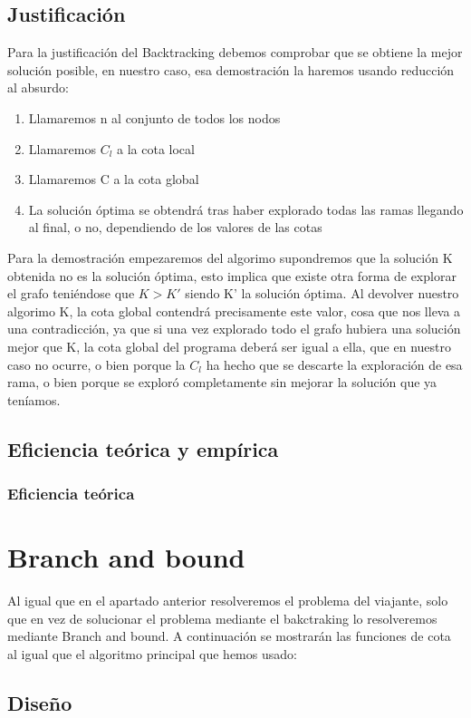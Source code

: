 \documentclass[11pt,openany]{book}
\begin{document}
\section{Justificación}
Para la justificación del Backtracking debemos comprobar que se obtiene la mejor solución posible, en nuestro caso, esa demostración la haremos usando reducción al absurdo:
\begin{enumerate}
    \item Llamaremos n al conjunto de todos los nodos
    \item Llamaremos $C_l$ a la cota local 
    \item Llamaremos C a la cota global
    \item La solución óptima se obtendrá tras haber explorado todas las ramas llegando al final, o no, dependiendo de los valores de las cotas
\end{enumerate}
Para la demostración empezaremos del algorimo supondremos que la solución K obtenida no es la solución óptima, esto implica que existe otra forma de explorar el grafo teniéndose que $K>K'$ siendo K' la solución óptima.
Al devolver nuestro algorimo K, la cota global contendrá precisamente este valor, cosa que nos lleva a una contradicción, ya que si una vez explorado todo el grafo hubiera una solución mejor que K, la cota global del programa deberá ser igual 
a ella, que en nuestro caso no ocurre, o bien porque la $C_l$ ha hecho que se descarte la exploración de esa rama, o bien porque se exploró completamente sin mejorar la solución que ya teníamos.

\section{Eficiencia teórica y empírica}
\subsection{Eficiencia teórica}


\chapter{Branch and bound}
Al igual que en el apartado anterior resolveremos el problema del viajante, solo que en vez de solucionar el problema mediante el bakctraking 
lo resolveremos mediante Branch and bound. A continuación se mostrarán las funciones de cota al igual que el algoritmo principal que hemos usado:

\section{Diseño}
\end{document}
